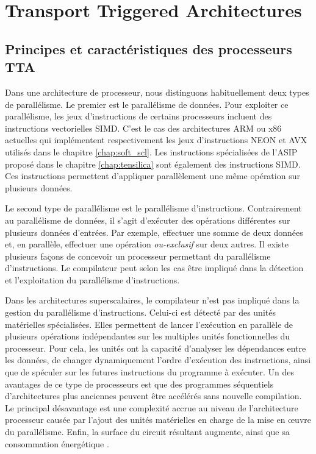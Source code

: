 \section{Transport Triggered Architectures}
\label{sec:tta_description}

\subsection{Principes et caractéristiques des processeurs TTA}

Dans une architecture de processeur, nous distinguons habituellement deux types de parallélisme.
Le premier est le parallélisme de données.
Pour exploiter ce parallélisme, les jeux d'instructions de certains processeurs incluent des instructions vectorielles SIMD.
C'est le cas des architectures ARM ou x86 actuelles qui implémentent respectivement les jeux d'instructions NEON et AVX utilisés dans le chapitre \ref{chap:soft_scl}.
Les instructions spécialisées de l'ASIP proposé dans le chapitre \ref{chap:tensilica} sont également des instructions SIMD.
Ces instructions permettent d'appliquer parallèlement une même opération sur plusieurs données.

Le second type de parallélisme est le parallélisme d'instructions. Contrairement au parallélisme de données, il s'agit d'exécuter des opérations différentes sur plusieurs données d'entrées. Par exemple, effectuer une somme de deux données et, en parallèle, effectuer une opération \textit{ou-exclusif} sur deux autres.
Il existe plusieurs façons de concevoir un processeur permettant du parallélisme d'instructions. Le compilateur peut selon les cas être impliqué dans la détection et l'exploitation du parallélisme d'instructions.

Dans les architectures superscalaires, le compilateur n'est pas impliqué dans la gestion du parallélisme d'instructions. Celui-ci est détecté par des unités matérielles spécialisées. 
Elles permettent de lancer l'exécution en parallèle de plusieurs opérations indépendantes sur les multiples unités fonctionnelles du processeur.
Pour cela, les unités ont la capacité d'analyser les dépendances entre les données, de changer dynamiquement l'ordre d'exécution des instructions, ainsi que de spéculer sur les futures instructions du programme à exécuter.
Un des avantages de ce type de processeurs est que des programmes séquentiels d'architectures plus anciennes peuvent être accélérés sans nouvelle compilation. Le principal désavantage est une  complexité accrue au niveau de l'architecture processeur causée par l'ajout des unités matérielles en charge de la mise en œuvre du parallélisme. Enfin, la surface du circuit résultant augmente, ainsi que sa consommation énergétique \cite{rau1993instruction}.


